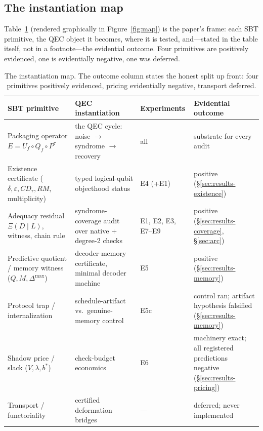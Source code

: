 \documentclass[11pt]{article}
\newcommand{\Xires}{\Xi(D \mid L)}
\theoremstyle{definition}
\begin{document}
\subsection{The instantiation map}
\label{sec:map}

Table~\ref{tab:map} (rendered graphically in Figure~\ref{fig:map}) is the paper's frame: each SBT primitive, the QEC object it becomes, where it is tested, and---stated in the table itself, not in a footnote---the evidential outcome. Four primitives are positively evidenced, one is evidentially negative, one was deferred. 

\begin{table}[htbp]
\centering\small
\begin{tabular}{p{3.6cm} p{4.6cm} p{2.2cm} p{3.4cm}}
\toprule
SBT primitive & QEC instantiation & Experiments & Evidential outcome \\
\midrule
Packaging operator $E = U_f \circ Q_f \circ P^\tau$ & the QEC cycle: noise $\to$ syndrome $\to$ recovery & all & substrate for every audit \\
Existence certificate ($\delta, \varepsilon, CD_\tau, RM$, multiplicity) & typed logical-qubit objecthood status & E4 (+E1) & positive (\S\ref{sec:results-existence}) \\
Adequacy residual $\Xires$, witness, chain rule & syndrome-coverage audit over native + degree-2 checks & E1, E2, E3, E7--E9 & positive (\S\ref{sec:results-coverage}, \S\ref{sec:arc}) \\
Predictive quotient / memory witness ($Q, M, \Delta^{\max}$) & decoder-memory certificate, minimal decoder machine & E5 & positive (\S\ref{sec:results-memory}) \\
Protocol trap / internalization & schedule-artifact vs.\ genuine-memory control & E5c & control ran; artifact hypothesis falsified (\S\ref{sec:results-memory}) \\
Shadow price / slack ($V, \lambda, b^{*}$) & check-budget economics & E6 & machinery exact; all registered predictions negative (\S\ref{sec:results-pricing}) \\
Transport / functoriality & certified deformation bridges & --- & deferred; never implemented \\
\bottomrule
\end{tabular}
\caption{The instantiation map. The outcome column states the honest split up front: four primitives positively evidenced, pricing evidentially negative, transport deferred.} \label{tab:map}
\end{table}
\end{document}
